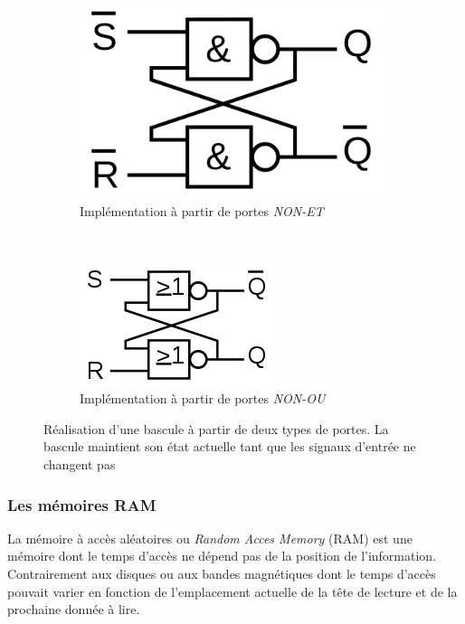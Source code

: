 \begin{figure}
    \begin{subfigure}[]{0.48\linewidth}\centering
        \includegraphics[width=0.60\linewidth]{images/processeurs_porte_bascule_nand.png}
        \caption{Implémentation à partir de portes \textit{NON-ET}}
        \label{pic_processeurs_porte_bascule_nand}
    \end{subfigure}
    ~ %
    \begin{subfigure}[]{0.48\linewidth}\centering
        \includegraphics[width=0.60\linewidth]{images/processeurs_porte_bascule_nor.png}
        \caption{Implémentation à partir de portes \textit{NON-OU}}
        \label{pic_processeurs_porte_bascule_nor}
    \end{subfigure}
    \caption{Réalisation d'une bascule à partir de deux types de portes. La bascule maintient son état actuelle tant que les signaux d'entrée ne changent pas}
    \label{fig_processeurs_porte_bascule}
\end{figure}


\subsubsection{Les mémoires RAM}

La mémoire à accès aléatoires ou \textit{Random Acces Memory} (RAM) est une mémoire dont le temps d'accès ne dépend pas de la position de l'information. Contrairement aux disques ou aux bandes magnétiques dont le temps d'accès pouvait varier en fonction de l'emplacement actuelle de la tête de lecture et de la prochaine donnée à lire.

